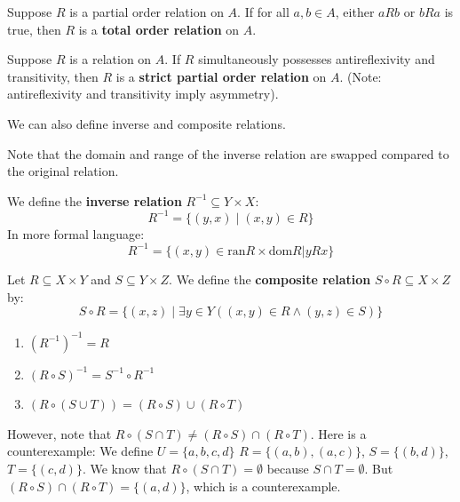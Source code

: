 \begin{definition}
Suppose $R$ is a partial order relation on $A$. If for all $a, b \in A$, either $aRb$ or $bRa$ is true, then $R$ is a \textbf{total order relation} on $A$.
\end{definition}

\begin{definition}
Suppose $R$ is a relation on $A$. If $R$ simultaneously possesses antireflexivity and transitivity, then $R$ is a \textbf{strict partial order relation} on $A$. (Note: antireflexivity and transitivity imply asymmetry).
\end{definition}

We can also define inverse and composite relations.

Note that the domain and range of the inverse relation are swapped compared to the original relation.

\begin{definition}
We define the \textbf{inverse relation} $R^{-1} \subseteq Y \times X$:
$$ R^{-1} = \{ (y,x) \mid (x,y) \in R \} $$
In more formal language:
\[
R^{-1} = \{(x,y) \in \text{ran}R \times \text{dom}R | yRx\}
\]
\end{definition}

\begin{definition}
Let $R \subseteq X \times Y$ and $S \subseteq Y \times Z$. We define the \textbf{composite relation} $S \circ R \subseteq X \times Z$ by:
$$ S \circ R = \{ (x,z) \mid \exists y \in Y ((x,y) \in R \wedge (y,z) \in S) \} $$
\end{definition}
\begin{theorem}
\begin{enumerate}
    \item $(R^{-1})^{-1} = R$
    \item $(R \circ S)^{-1} = S^{-1} \circ R^{-1}$
    \item $(R \circ (S \cup T)) = (R \circ S) \cup (R \circ T)$
\end{enumerate}
\end{theorem}
However, note that $R \circ (S \cap T) \neq (R \circ S) \cap (R \circ T)$.
Here is a counterexample:
We define $U=\{a,b,c,d\}$ $R=\{(a,b),(a,c)\}$, $S=\{(b,d)\}$, $T=\{(c,d)\}$.
We know that $R \circ (S \cap T)  = \emptyset$ because $S \cap T = \emptyset$. But $(R \circ S) \cap (R \circ T) = \{(a,d)\}$, which is a counterexample.

